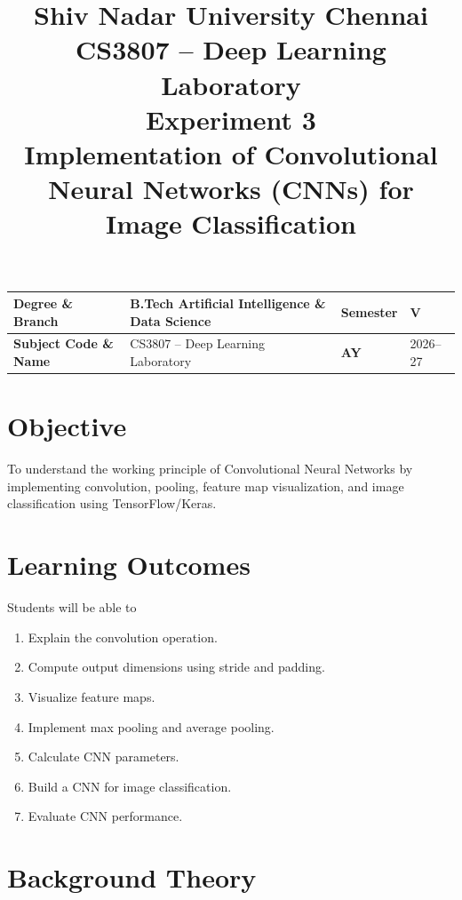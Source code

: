 \documentclass[11pt]{article}
\title{\textbf{Shiv Nadar University Chennai} \\[4pt]
\large CS3807 -- Deep Learning Laboratory \\[8pt]
\large Experiment 3 \\[4pt]
\Large Implementation of Convolutional Neural Networks (CNNs) for Image Classification}
\author{}
\date{}
\begin{document}
\maketitle
\thispagestyle{fancy}

\begin{center}
\begin{tabular}{|p{}|p{}|p{}|p{}|}
\hline
\textbf{Degree \& Branch} & B.Tech Artificial Intelligence \& Data Science & \textbf{Semester} & V \\
\hline
\textbf{Subject Code \& Name} & CS3807 -- Deep Learning Laboratory & \textbf{AY} & 2026--27 \\
\hline
\end{tabular}
\end{center}

\vspace{1em}

\section{Objective}
To understand the working principle of Convolutional Neural Networks by implementing convolution, pooling, feature map visualization, and image classification using TensorFlow/Keras.

\section{Learning Outcomes}
Students will be able to
\begin{enumerate}
    \item Explain the convolution operation.
    \item Compute output dimensions using stride and padding.
    \item Visualize feature maps.
    \item Implement max pooling and average pooling.
    \item Calculate CNN parameters.
    \item Build a CNN for image classification.
    \item Evaluate CNN performance.
\end{enumerate}

\section{Background Theory}
\end{document}
